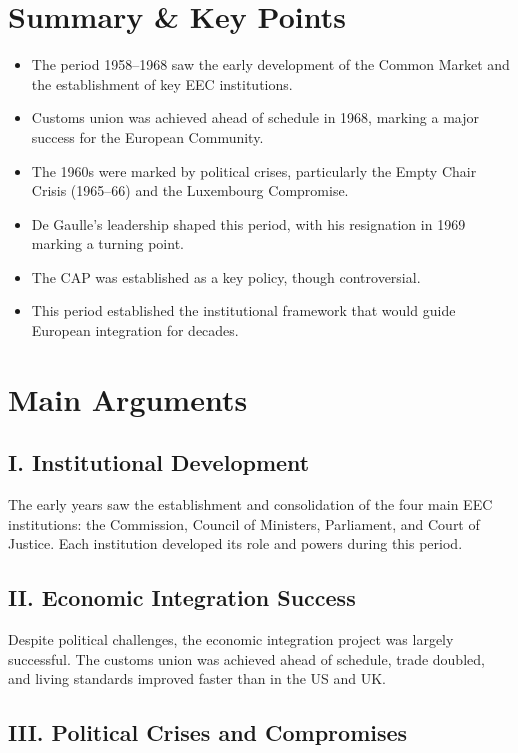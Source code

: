 \documentclass[11pt,a4paper]{article}
\begin{document}
\section*{Summary \& Key Points}

\begin{itemize}
\item The period 1958--1968 saw the early development of the Common Market and the establishment of key EEC institutions.
\item Customs union was achieved ahead of schedule in 1968, marking a major success for the European Community.
\item The 1960s were marked by political crises, particularly the Empty Chair Crisis (1965--66) and the Luxembourg Compromise.
\item De Gaulle's leadership shaped this period, with his resignation in 1969 marking a turning point.
\item The CAP was established as a key policy, though controversial.
\item This period established the institutional framework that would guide European integration for decades.
\end{itemize}

\section*{Main Arguments}

\subsection*{I. Institutional Development}

The early years saw the establishment and consolidation of the four main EEC institutions: the Commission, Council of Ministers, Parliament, and Court of Justice. Each institution developed its role and powers during this period.

\subsection*{II. Economic Integration Success}

Despite political challenges, the economic integration project was largely successful. The customs union was achieved ahead of schedule, trade doubled, and living standards improved faster than in the US and UK.

\subsection*{III. Political Crises and Compromises}
\end{document}
